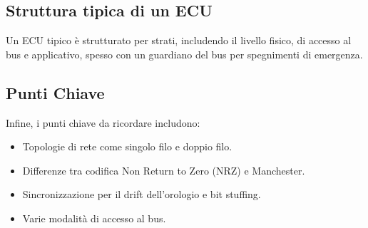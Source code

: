 \subsection{Struttura tipica di un ECU}
Un ECU tipico è strutturato per strati, includendo il livello fisico, di accesso al bus e applicativo, spesso con un guardiano del bus per spegnimenti di emergenza.

\subsection{Punti Chiave}
Infine, i punti chiave da ricordare includono:
\begin{itemize}
    \item Topologie di rete come singolo filo e doppio filo.
    \item Differenze tra codifica Non Return to Zero (NRZ) e Manchester.
    \item Sincronizzazione per il drift dell'orologio e bit stuffing.
    \item Varie modalità di accesso al bus.
\end{itemize}
